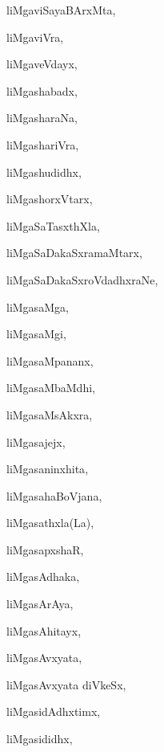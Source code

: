 \begin{multicols}{3}
{\noindent
{liMgaviSayaBArxMta}, \pageref{liMgaviSayaBArxMta}

\noindent
{liMgaviVra}, \pageref{liMgaviVra}

\noindent
{liMgaveVdayx}, \pageref{liMgaveVdayx}

\noindent
{liMgashabadx}, \pageref{liMgashabadx}

\noindent
{liMgasharaNa}, \pageref{liMgasharaNa}

\noindent
{liMgashariVra}, \pageref{liMgashariVra}

\noindent
{liMgashudidhx}, \pageref{liMgashudidhx}

\noindent
{liMgashorxVtarx}, \pageref{liMgashorxVtarx}

\noindent
{liMgaSaTasxthXla}, \pageref{liMgaSaTasxthXla}

\noindent
{liMgaSaDakaSxramaMtarx}, \pageref{liMgaSaDakaSxramaMtarx}

\noindent
{liMgaSaDakaSxroVdadhxraNe}, \pageref{liMgaSaDakaSxroVdadhxraNe}

\noindent
{liMgasaMga}, \pageref{liMgasaMga}

\noindent
{liMgasaMgi}, \pageref{liMgasaMgi}

\noindent
{liMgasaMpananx}, \pageref{liMgasaMpananx}

\noindent
{liMgasaMbaMdhi}, \pageref{liMgasaMbaMdhi}

\noindent
{liMgasaMsAkxra}, \pageref{liMgasaMsAkxra}

\noindent
{liMgasajejx}, \pageref{liMgasajejx}

\noindent
{liMgasaninxhita}, \pageref{liMgasaninxhita}

\noindent
{liMgasahaBoVjana}, \pageref{liMgasahaBoVjana}

\noindent
{liMgasathxla(La)}, \pageref{liMgasathxla(La)}

\noindent
{liMgasapxshaR}, \pageref{liMgasapxshaR}

\noindent
{liMgasAdhaka}, \pageref{liMgasAdhaka}

\noindent
{liMgasArAya}, \pageref{liMgasArAya}

\noindent
{liMgasAhitayx}, \pageref{liMgasAhitayx}

\noindent
{liMgasAvxyata}, \pageref{liMgasAvxyata}

\noindent
{liMgasAvxyata diVkeSx}, \pageref{liMgasAvxyatadiVkeSx}

\noindent
{liMgasidAdhxtimx}, \pageref{liMgasidAdhxtimx}

\noindent
{liMgasididhx}, \pageref{liMgasididhx}

}
\end{multicols}
